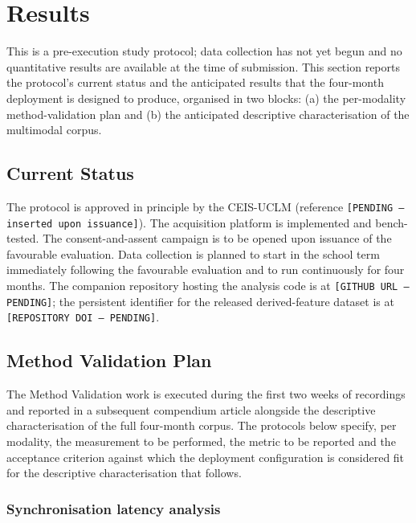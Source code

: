 \section{Results}\label{sec:results}

This is a pre-execution study protocol; data collection has not yet begun and no quantitative results are available at the time of submission. This section reports the protocol's current status and the anticipated results that the four-month deployment is designed to produce, organised in two blocks: (a) the per-modality method-validation plan and (b) the anticipated descriptive characterisation of the multimodal corpus.

\subsection{Current Status}\label{subsec:status}

The protocol is approved in principle by the CEIS-UCLM (reference \texttt{[PENDING --- inserted upon issuance]}). The acquisition platform is implemented and bench-tested. The consent-and-assent campaign is to be opened upon issuance of the favourable evaluation. Data collection is planned to start in the school term immediately following the favourable evaluation and to run continuously for four months. The companion repository hosting the analysis code is at \texttt{[GITHUB URL --- PENDING]}; the persistent identifier for the released derived-feature dataset is at \texttt{[REPOSITORY DOI --- PENDING]}.

\subsection{Method Validation Plan}\label{subsec:method-validation}

The Method Validation work is executed during the first two weeks of recordings and reported in a subsequent compendium article alongside the descriptive characterisation of the full four-month corpus. The protocols below specify, per modality, the measurement to be performed, the metric to be reported and the acceptance criterion against which the deployment configuration is considered fit for the descriptive characterisation that follows.

\subsubsection{Synchronisation latency analysis}\label{subsec:val-sync}

